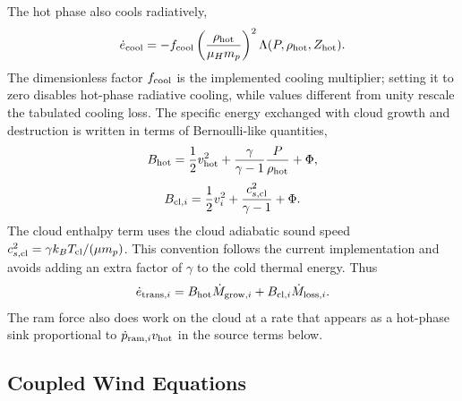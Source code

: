 The hot phase also cools radiatively,
\begin{equation}
\dot{e}_{\rm cool}
=
-f_{\rm cool}
\left(\frac{\rho_{\rm hot}}{\mu_H m_p}\right)^2
\Lambda(P,\rho_{\rm hot},Z_{\rm hot}).
\end{equation}
The dimensionless factor $f_{\rm cool}$ is the implemented cooling multiplier; setting it to zero disables hot-phase radiative cooling, while values different from unity rescale the tabulated cooling loss.
The specific energy exchanged with cloud growth and destruction is written in terms of Bernoulli-like quantities,
\begin{equation}
B_{\rm hot}
=
\frac{1}{2}v_{\rm hot}^2
+
\frac{\gamma}{\gamma-1}\frac{P}{\rho_{\rm hot}}
+
\Phi,
\end{equation}
\begin{equation}
B_{{\rm cl},i}
=
\frac{1}{2}v_i^2
+
\frac{c_{s,{\rm cl}}^2}{\gamma-1}
+
\Phi.
\end{equation}
The cloud enthalpy term uses the cloud adiabatic sound speed $c_{s,{\rm cl}}^2=\gamma k_B T_{\rm cl}/(\mu m_p)$.
This convention follows the current implementation and avoids adding an extra factor of $\gamma$ to the cold thermal energy.
Thus
\begin{equation}
\dot{e}_{{\rm trans},i}
=
B_{\rm hot}\dot{M}_{{\rm grow},i}
+
B_{{\rm cl},i}\dot{M}_{{\rm loss},i}.
\end{equation}
The ram force also does work on the cloud at a rate that appears as a hot-phase sink proportional to $\dot{p}_{{\rm ram},i}v_{\rm hot}$ in the source terms below.

\subsection{Coupled Wind Equations}
\label{subsec:model_coupled_equations}

